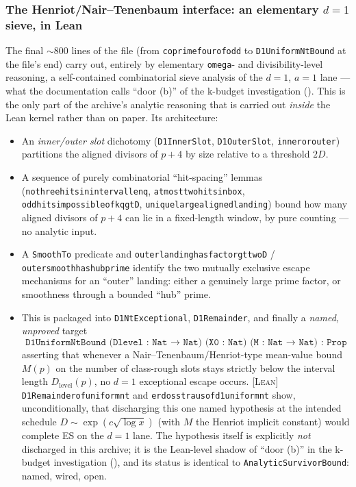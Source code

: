 \documentclass[11pt]{article}
\theoremstyle{plain}
\theoremstyle{definition}
\theoremstyle{remark}
\newcommand{\LEAN}{\textcolor{proved}{\textsc{[Lean]}}}
\newcommand{\lean}[1]{\texttt{#1}}
\renewcommand{\_}{\textunderscore\allowbreak}
\begin{document}
\subsubsection{The Henriot/Nair--Tenenbaum interface: an elementary $d=1$ sieve, in Lean}
\label{subsec:henriot-lean}

The final $\sim 800$ lines of the file (from \lean{coprime\_four\_of\_odd} to
\lean{D1UniformNtBound} at the file's end) carry out, entirely by elementary \texttt{omega}- and
divisibility-level reasoning, a self-contained combinatorial sieve analysis of the $d=1$,
$a=1$ lane — what the documentation calls ``door (b)'' of the k-budget investigation
(). This is the only part of the archive's analytic reasoning that is
carried out \emph{inside} the Lean kernel rather than on paper. Its architecture:
\begin{itemize}[leftmargin=1.4em]
  \item An \emph{inner/outer slot} dichotomy (\lean{D1InnerSlot}, \lean{D1OuterSlot},
        \lean{inner\_or\_outer}) partitions the aligned divisors of $p+4$ by size relative to a
        threshold $2D$.
  \item A sequence of purely combinatorial ``hit-spacing'' lemmas
        (\lean{no\_three\_hits\_in\_interval\_len\_q}, \lean{at\_most\_two\_hits\_in\_box},
        \lean{odd\_hits\_impossible\_of\_kq\_gt\_D}, \lean{unique\_large\_aligned\_landing})
        bound how many aligned divisors of $p+4$ can lie in a fixed-length window, by pure
        counting — no analytic input.
  \item A \lean{SmoothTo} predicate and \lean{outer\_landing\_has\_factor\_gt\_two\_D} /
        \lean{outer\_smooth\_has\_hub\_prime} identify the two mutually exclusive escape
        mechanisms for an ``outer'' landing: either a genuinely large prime factor, or
        smoothness through a bounded ``hub'' prime.
  \item This is packaged into \lean{D1NtExceptional}, \lean{D1Remainder}, and finally a
        \emph{named, unproved} target
        \[
        \texttt{D1UniformNtBound (Dlevel : Nat → Nat) (X0 : Nat) (M : Nat → Nat) : Prop}
        \]
        asserting that whenever a Nair--Tenenbaum/Henriot-type mean-value bound $M(p)$ on the
        number of class-rough slots stays strictly below the interval length $D_{\mathrm{level}}(p)$,
        no $d=1$ exceptional escape occurs. \LEAN{} \lean{D1Remainder\_of\_uniform\_nt} and
        \lean{erdos\_straus\_of\_d1\_uniform\_nt} show, unconditionally, that discharging this
        one named hypothesis at the intended schedule $D\sim\exp(c\sqrt{\log x})$ (with $M$ the
        Henriot implicit constant) would complete ES on the $d=1$ lane. The hypothesis itself is
        explicitly \emph{not} discharged in this archive; it is the Lean-level shadow of ``door
        (b)'' in the k-budget investigation (), and its status is
        identical to \lean{AnalyticSurvivorBound}: named, wired, open.
\end{itemize}
\end{document}
